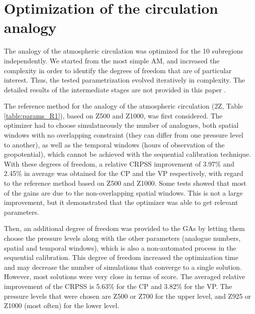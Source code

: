 \documentclass[review]{elsarticle}
\begin{document}
\section{Optimization of the circulation analogy}
\label{sec:optim_circul}

The analogy of the atmospheric circulation was optimized for the 10 subregions  independently. We started from the most simple AM, and increased the complexity in order to identify the degrees of freedom that are of particular interest. Thus, the tested parametrization evolved iteratively in complexity. The detailed results of the intermediate stages are not provided in this paper \citep[see][for the details]{Horton2012a}.

The reference method for the analogy of the atmospheric circulation (2Z, Table \ref{table:params_R1}), based on Z500 and Z1000, was first considered. The optimizer had to choose simulatneously the number of analogues, both spatial windows with no overlapping constraint (they can differ from one pressure level to another), as well as the temporal windows (hours of observation of the geopotential), which cannot be achieved with the sequential calibration technique. With these degrees of freedom, a relative CRPSS improvement of 3.97\% and 2.45\% in average was obtained for the CP and the VP respectively, with regard to the reference method based on Z500 and Z1000. Some tests showed that most of the gains are due to the non-overlapping spatial windows. This is not a large improvement, but it demonstrated that the optimizer was able to get relevant parameters.

Then, an additional degree of freedom was provided to the GAs by letting them choose the pressure levels along with the other parameters (analogue numbers, spatial and temporal windows), which is also a non-automated process in the sequential calibration. This degree of freedom increased the optimization time and may decrease the number of simulations that converge to a single solution. However, most solutions were very close in terms of score. The averaged relative improvement of the CRPSS is 5.63\% for the CP and 3.82\% for the VP. The pressure levels that were chosen are Z500 or Z700 for the upper level, and Z925 or Z1000 (most often) for the lower level.
\end{document}
